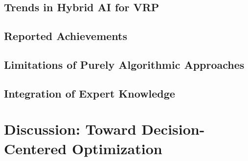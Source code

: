 \documentclass[preprint,12pt]{elsarticle}
\begin{document}
	\subsection{Trends in Hybrid AI for VRP}
	
	\subsection{Reported Achievements}
	
	\subsection{Limitations of Purely Algorithmic Approaches}
	
	\subsection{Integration of Expert Knowledge}
	
	\section{Discussion: Toward Decision-Centered Optimization}
	
\end{document}
